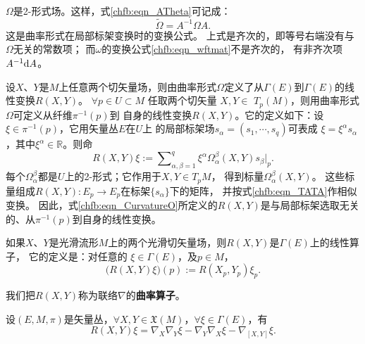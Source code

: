 $\Omega$是2-形式场。这样，式\eqref{chfb:eqn_ATheta}可记成：
\begin{equation}\label{chfb:eqn_TATA}
    \widetilde{\Omega} =A^{-1} \Omega A .
\end{equation}
这是曲率形式在局部标架变换时的变换公式。
上式是齐次的，即等号右端没有与$\Omega$无关的常数项；
而$\omega$的变换公式\eqref{chfb:eqn_wftmat}不是齐次的，
有非齐次项$A^{-1} \dd A$。

设$X$、$Y$是$M$上任意两个切矢量场，则由曲率形式$\Omega$定义了从$\Gamma(E)$到$\Gamma(E)$的线性变换$R(X, Y)$。
$\forall p \in U\subset M$ 任取两个切矢量 $X, Y \in$ $T_p(M)$，则用曲率形式$\Omega$可定义从纤维$\pi^{-1}(p)$到
自身的线性变换$R(X, Y)$。它的定义如下：设 $\xi \in \pi^{-1}(p)$，它用矢量丛$E$在$U$上
的局部标架场$s_\alpha=\left(s_1, \cdots, s_q\right)$可表成
$\xi = \xi^\alpha s_{\alpha}$，其中$\xi^\alpha \in \mathbb{R}$。则命
\begin{equation}\label{chfb:eqn_CurvatureO}
    R(X, Y) \xi :=\sum\nolimits_{\alpha, \beta=1}^q \xi^\alpha
    \Omega_{\alpha}^\beta(X, Y) s_{\beta}|_p .
\end{equation}
每个$\Omega^\beta_{\alpha}$都是$U$上的2-形式；它作用于$X,Y\in T_pM$，
得到标量$\Omega^\beta_{\alpha}(X,Y)$。
这些标量组成$R(X,Y):E_p\to E_p$在标架$\{s_\alpha\}$下的矩阵，
并按式\eqref{chfb:eqn_TATA}作相似变换。
因此，式\eqref{chfb:eqn_CurvatureO}所定义的$R(X, Y)$是与局部标架选取无关的、从$\pi^{-1}(p)$到自身的线性变换。

如果$X$、$Y$是光滑流形$M$上的两个光滑切矢量场，则$R(X, Y)$是$\Gamma(E)$上的线性算子，
它的定义是：对任意的 $\xi \in \Gamma(E)$，及$p \in  M$，
\begin{equation}\label{chfb:eqn_RppR}
    \bigl(R(X, Y) \xi \bigr)(p):=R\left(X_p, Y_p\right) \xi_p .
\end{equation}

我们把$R(X, Y)$称为联络$\nabla$的\textbf{曲率算子}。

\begin{theorem}
    设$(E,M,\pi)$是矢量丛，$\forall X, Y\in \mathfrak{X}(M)$，$\forall \xi \in \Gamma(E)$，有
    \begin{equation}\label{chfb:eqn_Riemann-Curvature}
       R(X, Y)\xi=\nabla_X \nabla_Y\xi- \nabla_Y \nabla_X\xi-\nabla_{[X, Y]}\xi .
    \end{equation}
\end{theorem}

